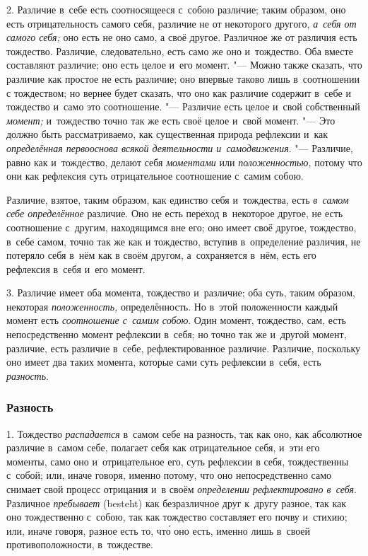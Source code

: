 2. Различие в~себе есть соотносящееся с~собою различие; таким образом, оно
есть отрицательность самого себя, различие не от некоторого другого,
{\em а~себя от самого себя;} оно есть не оно само, а
своё другое. Различное же от различия есть тождество. Различие,
следовательно, есть само же оно и~тождество. Оба вместе составляют
различие; оно есть целое и~его момент. "--- Можно также сказать, что различие
как простое не есть различие; оно впервые таково лишь в~соотношении с
тождеством; но вернее будет сказать, что оно как различие содержит в~себе и
тождество и~само это соотношение. "--- Различие есть целое и~свой собственный
{\em момент;} и~тождество точно так же есть своё целое
и~свой момент. "--- Это должно быть рассматриваемо, как существенная природа
рефлексии и~как {\em определённая первооснова всякой
деятельности и~самодвижения}. "--- Различие, равно как и~тождество, делают
себя {\em моментами} или
{\em положенностью,} потому что они как рефлексия суть
отрицательное соотношение с~самим собою.

Различие, взятое, таким образом, как единство себя и~тождества, есть
{\em в~самом себе определённое} различие. Оно не есть
переход в~некоторое другое, не есть соотношение с~другим, находящимся вне
его; оно имеет своё другое, тождество, в~себе самом, точно так же как и
тождество, вступив в~определение различия, не потеряло себя в~нём как в
своём другом, а~сохраняется в~нём, есть его рефлексия в~себя и~его момент.

3. Различие имеет оба момента, тождество и~различие; оба суть, таким
образом, некоторая {\em положенность,} определённость.
Но в~этой положенности каждый момент есть
{\em соотношение с~самим собою}. Один момент,
тождество, сам, есть непосредственно момент рефлексии в~себя; но точно так
же и~другой момент, различие, есть различие в~себе, рефлектированное
различие. Различие, поскольку оно имеет два таких момента, которые сами
суть рефлексии в~себя, есть {\em разность}.

\subsubsection{Разность}
1. Тождество {\em распадается} в~самом себе на разность, так как
оно, как абсолютное различие в~самом себе, полагает себя как отрицательное
себя, и~эти его моменты, само оно и~отрицательное его, суть рефлексии в
себя, тождественны с~собой; или, иначе говоря, именно потому, что оно
непосредственно само снимает свой процесс отрицания и~в своём
{\em определении рефлектировано в~себя}. Различное
{\em пребывает} (besteht) как безразличное друг к~другу
разное, так как оно тождественно с~собою, так как тождество составляет его
почву и~стихию; или, иначе говоря, разное есть то, чт\'{о} оно есть, именно
лишь в~своей противоположности, в~тождестве.

